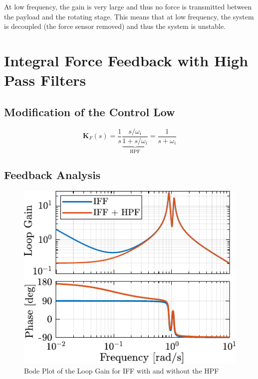 \documentclass{ISMA_USD2020}
\begin{document}
At low frequency, the gain is very large and thus no force is transmitted between the payload and the rotating stage.
This means that at low frequency, the system is decoupled (the force sensor removed) and thus the system is unstable.

\section{Integral Force Feedback with High Pass Filters}
\label{sec:org2e1883a}
\subsection{Modification of the Control Low}
\label{sec:org218110f}
\begin{equation}
  \bm{K}_{F}(s) = \frac{1}{s} \underbrace{\frac{s/\omega_i}{1 + s/\omega_i}}_{\text{HPF}} = \frac{1}{s + \omega_i}
\end{equation}


\subsection{Feedback Analysis}
\label{sec:org03090fc}

\begin{figure}[htbp]
\centering
\includegraphics[scale=1]{figs/loop_gain_modified_iff.pdf}
\caption{\label{fig:loop_gain_modified_iff}Bode Plot of the Loop Gain for IFF with and without the HPF}
\end{figure}
\end{document}
